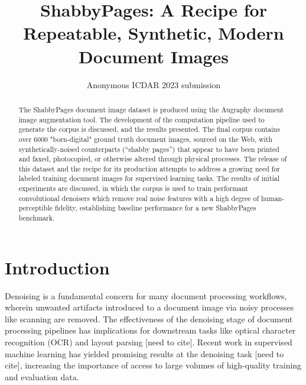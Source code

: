 \documentclass[runningheads]{llncs}
\begin{document}
\title{ShabbyPages: A Recipe for Repeatable, Synthetic, Modern Document Images}
%
%

\author{Anonymous ICDAR 2023 submission}


\maketitle

\begin{abstract}
The ShabbyPages document image dataset is produced using the Augraphy document image augmentation tool.
The development of the computation pipeline used to generate the corpus is discussed, and the results presented.
The final corpus contains over 6000 "born-digital" ground truth document images, sourced on the Web, with synthetically-noised counterparts (``shabby pages'') that appear to have been printed and faxed, photocopied, or otherwise altered through physical processes.
The release of this dataset and the recipe for its production attempts to address a growing need for labeled training document images for supervised learning tasks.
The results of initial experiments are discussed, in which the corpus is used to train performant convolutional denoisers which remove real noise features with a high degree of human-perceptible fidelity, establishing baseline performance for a new ShabbyPages benchmark.
\end{abstract}

\section{Introduction}
Denoising is a fundamental concern for many document processing workflows, wherein unwanted artifacts introduced to a document image via noisy processes like scanning are removed.
The effectiveness of the denoising stage of document processing pipelines has implications for downstream tasks like optical character recognition (OCR) and layout parsing [need to cite].
Recent work in supervised machine learning has yielded promising results at the denoising task [need to cite], increasing the importance of access to large volumes of high-quality training and evaluation data.
\end{document}
